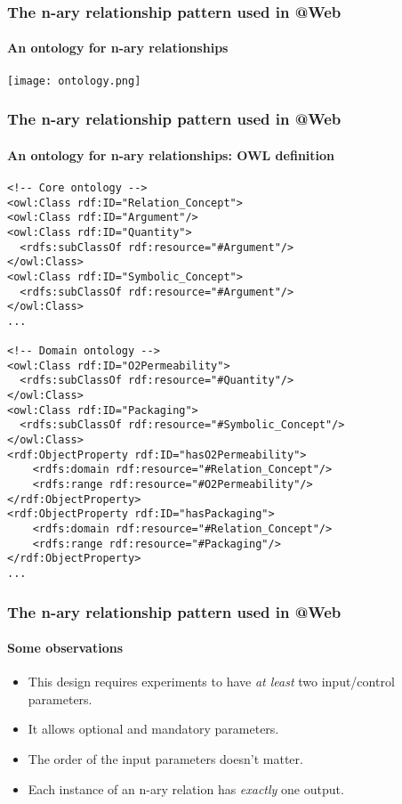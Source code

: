 \documentclass{beamer}
\makeatletter
\newcommand{\atweb}{\textbf{@Web}\xspace}
\makeatother
\begin{document}
\begin{frame}
  \frametitle{The n-ary relationship pattern used in \atweb}
  \framesubtitle{An ontology for n-ary relationships}

  \begin{center}
    \texttt{[image: ontology.png]}
  \end{center}
\end{frame}

\begin{frame}[fragile]
  \frametitle{The n-ary relationship pattern used in \atweb}
  \framesubtitle{An ontology for n-ary relationships: OWL definition}

  \begin{Verbatim}[fontsize=\tiny]
<!-- Core ontology -->
<owl:Class rdf:ID="Relation_Concept">
<owl:Class rdf:ID="Argument"/>
<owl:Class rdf:ID="Quantity">
  <rdfs:subClassOf rdf:resource="#Argument"/>
</owl:Class>
<owl:Class rdf:ID="Symbolic_Concept">
  <rdfs:subClassOf rdf:resource="#Argument"/>
</owl:Class>
...

<!-- Domain ontology -->
<owl:Class rdf:ID="O2Permeability">
  <rdfs:subClassOf rdf:resource="#Quantity"/>
</owl:Class>
<owl:Class rdf:ID="Packaging">
  <rdfs:subClassOf rdf:resource="#Symbolic_Concept"/>
</owl:Class>
<rdf:ObjectProperty rdf:ID="hasO2Permeability">
    <rdfs:domain rdf:resource="#Relation_Concept"/>
    <rdfs:range rdf:resource="#O2Permeability"/>
</rdf:ObjectProperty>
<rdf:ObjectProperty rdf:ID="hasPackaging">
    <rdfs:domain rdf:resource="#Relation_Concept"/>
    <rdfs:range rdf:resource="#Packaging"/>
</rdf:ObjectProperty>
...
  \end{Verbatim}
\end{frame}

\begin{frame}
  \frametitle{The n-ary relationship pattern used in \atweb}
  \framesubtitle{Some observations}

  \begin{itemize}
    \item This design requires experiments to have \textit{at least} two
      input/control parameters.

    \pause

    \item It allows optional and mandatory parameters.

    \pause

    \item The order of the input parameters doesn't matter.

    \pause

    \item Each instance of an n-ary relation has \textit{exactly} one output.
  \end{itemize}
\end{frame}
\end{document}
